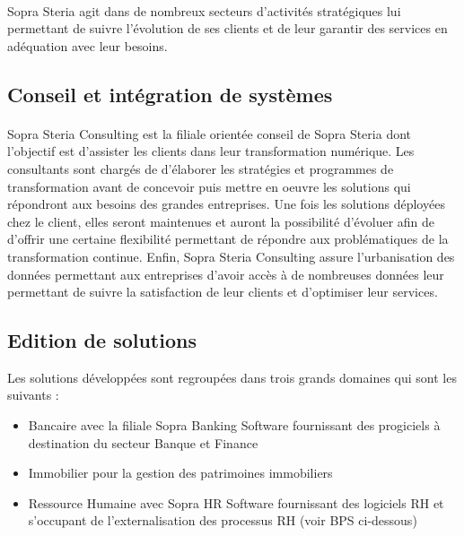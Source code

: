 \paragraph{}
Sopra Steria agit dans de nombreux secteurs d'activités stratégiques lui permettant de suivre l'évolution de ses clients et de leur garantir des services en adéquation avec leur besoins.

\subsection{Conseil et intégration de systèmes}

\paragraph{}
Sopra Steria Consulting est la filiale orientée conseil de Sopra Steria dont l'objectif est d'assister les clients dans leur transformation numérique. Les consultants sont chargés de d'élaborer les stratégies et programmes de transformation avant de concevoir puis mettre en oeuvre les solutions qui répondront aux besoins des grandes entreprises. Une fois les solutions déployées chez le client, elles seront maintenues et auront la possibilité d'évoluer afin de d'offrir une certaine flexibilité permettant de répondre aux problématiques de la transformation continue. Enfin, Sopra Steria Consulting assure l'urbanisation des données permettant aux entreprises d'avoir accès à de nombreuses données leur permettant de suivre la satisfaction de leur clients et d'optimiser leur services.

\newpage

\subsection{Edition de solutions}
Les solutions développées sont regroupées dans trois grands domaines qui sont les suivants :
\begin{itemize}
	\item Bancaire avec la filiale Sopra Banking Software fournissant des progiciels à destination du secteur Banque et Finance
	\item Immobilier pour la gestion des patrimoines immobiliers
	\item Ressource Humaine avec Sopra HR Software fournissant des logiciels RH et s'occupant de l'externalisation des processus RH (voir BPS ci-dessous)
\end{itemize}

